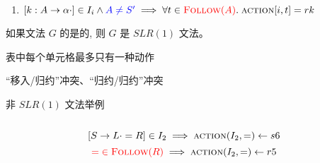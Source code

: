 
\begin{frame}{}
  \begin{center}


    \begin{enumerate}[(3)]
      \centering
      \item $[k: A \to \alpha \cdot] \in I_{i} \land \textcolor{blue}{A \neq S'} \implies
        \forall t \in \textcolor{red}{\textsc{Follow}(A)}.\; \textsc{action}[i, t] = rk$
    \end{enumerate}
  \end{center}
\end{frame}

\begin{frame}{}
  \begin{definition}[$SLR(1)$文法]
    如果文法 $G$ 的是的,
    则 $G$ 是 $SLR(1)$ 文法。
  \end{definition}

  \vspace{0.30cm}
  \begin{center}
     \action{}表中每个单元格最多只有一种动作 \\[8pt]


    \pause
     ``移入/归约''冲突、``归约/归约''冲突
  \end{center}
\end{frame}

\begin{frame}{}
  \begin{center}
    非 $SLR(1)$ 文法举例
  \end{center}

  \begin{columns}
  \end{columns}

  \vspace{0.30cm}
  \[
    [S \to L \cdot = R] \in I_{2} \implies \textsc{action}(I_{2}, =) \gets s6
  \]
  \[
    \textcolor{red}{=\; \in \textsc{Follow}(R)} \implies \textsc{action}(I_{2}, =) \gets r5
  \]
\end{frame}

